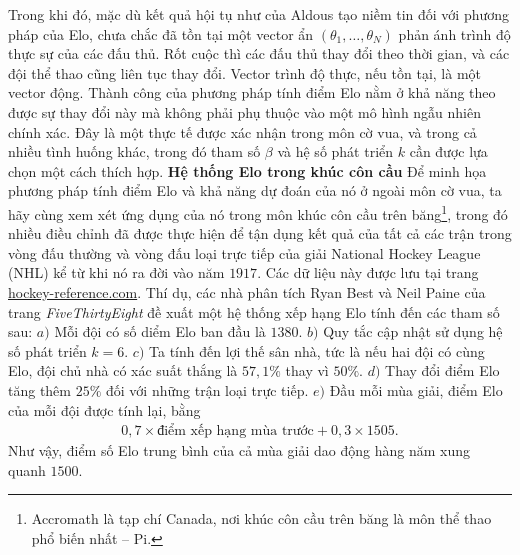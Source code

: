 \begin{multicols}{2}
	\vskip 0.05cm
	Trong khi đó, mặc dù kết quả hội tụ như của Aldous tạo niềm tin đối với phương pháp của Elo, chưa chắc đã tồn tại một vector ẩn $(\theta_1, \dots, \theta_N)$ phản ánh trình độ thực sự của các đấu thủ. Rốt cuộc thì các đấu thủ thay đổi theo thời gian, và các đội thể thao cũng liên tục thay đổi. Vector trình độ thực, nếu tồn tại, là một vector động.
	\vskip 0.05cm
	Thành công của phương pháp tính điểm Elo nằm ở khả năng theo được sự thay đổi này mà không phải phụ thuộc vào một mô hình ngẫu nhiên chính xác. Đây là một thực tế được xác nhận trong môn cờ vua, và trong cả nhiều tình huống khác, trong đó tham số $\beta$ và hệ số phát triển $k$ cần được lựa chọn một cách thích hợp.
	\vskip 0.05cm
	\textbf{\color{toanhocdoisong}Hệ thống Elo trong khúc côn cầu}
	\vskip 0.05cm
	Để minh họa phương pháp tính điểm Elo và khả năng dự đoán của nó ở ngoài môn cờ vua, ta hãy cùng xem xét ứng dụng của nó trong môn khúc côn cầu trên băng\footnote[4]{\color{toanhocdoisong}Accromath là tạp chí Canada, nơi khúc côn cầu trên băng là môn thể thao phổ biến nhất -- Pi.}, trong đó nhiều điều chỉnh đã được thực hiện để tận dụng kết quả của tất cả các trận trong vòng đấu thường và vòng đấu loại trực tiếp của giải National Hockey League (NHL) kể từ khi nó ra đời vào năm $1917$. Các dữ liệu này được lưu tại trang \url{hockey-reference.com}.
	\vskip 0.05cm
	Thí dụ, các nhà phân tích Ryan Best và Neil Paine của trang \textit{FiveThirtyEight} đề xuất một hệ thống xếp hạng Elo tính đến các tham số sau:
	\vskip 0.05cm
	$a)$ Mỗi đội có số diểm Elo ban đầu là $1380$.
	\vskip 0.05cm
	$b)$ Quy tắc cập nhật sử dụng hệ số phát triển $k = 6$.
	\vskip 0.05cm
	$c)$ Ta tính đến lợi thế sân nhà, tức là nếu hai đội có cùng Elo, đội chủ nhà có xác suất thắng là $57{,}1\%$ thay vì $50\%$.
	\vskip 0.05cm
	$d)$ Thay đổi điểm Elo tăng thêm $25\%$ đối với những trận loại trực tiếp.
	\vskip 0.05cm
	$e)$ Đầu mỗi mùa giải, điểm Elo của mỗi đội được tính lại, bằng
	\begin{align*}
		0{,}7 \!\times\!\text{điểm xếp hạng mùa trước} + 0{,}3 \!\times\!\! 1505.
	\end{align*}
	Như vậy, điểm số Elo trung bình của cả mùa giải dao động hàng năm xung quanh $1500$.
	\begin{figure}[H]
		\vspace*{-5pt}
		\centering
		\captionsetup{labelformat= empty, justification=centering}

\end{figure}
\end{multicols}
